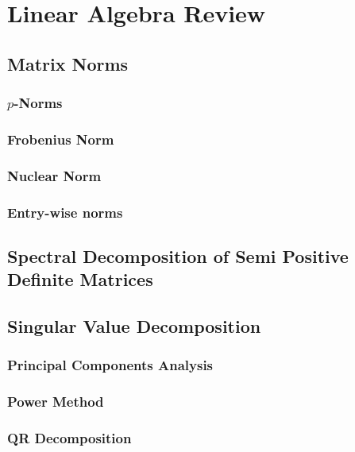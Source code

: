 \section{Linear Algebra Review}
\subsection{Matrix Norms}
\subsubsection{$p$-Norms}
\subsubsection{Frobenius Norm}
\subsubsection{Nuclear Norm}
\subsubsection{Entry-wise norms}
\subsection{Spectral Decomposition of Semi Positive Definite Matrices}
\subsection{Singular Value Decomposition}
\subsubsection{Principal Components Analysis}
\subsubsection{Power Method}
\subsubsection{QR Decomposition}